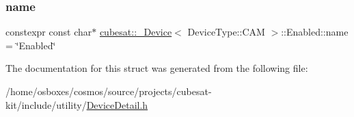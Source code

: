 \subsubsection{\texorpdfstring{name}{name}}
{\footnotesize\ttfamily constexpr const char$\ast$ \hyperlink{structcubesat_1_1__Device}{cubesat\+::\+\_\+\+Device}$<$ Device\+Type\+::\+C\+AM $>$\+::Enabled\+::name = \char`\"{}Enabled\char`\"{}\hspace{0.3cm}{\ttfamily [static]}}



The documentation for this struct was generated from the following file\+:\begin{DoxyCompactItemize}
\item 
/home/osboxes/cosmos/source/projects/cubesat-\/kit/include/utility/\hyperlink{DeviceDetail_8h}{Device\+Detail.\+h}\end{DoxyCompactItemize}
